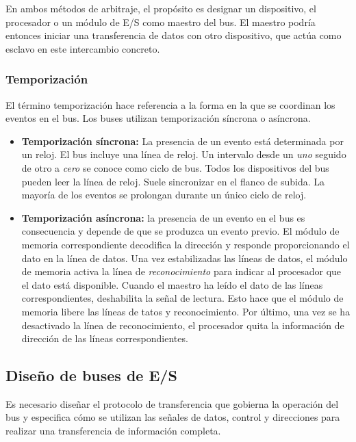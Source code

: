 En ambos métodos de arbitraje, el propósito es designar un dispositivo, el procesador o un módulo de E/S como maestro del bus. El maestro podría entonces iniciar una transferencia de datos con otro dispositivo, que actúa como esclavo en este intercambio concreto.

\subsubsection*{Temporización}

El término temporización hace referencia a la forma en la que se coordinan los eventos en el bus. Los buses utilizan temporización síncrona o asíncrona.

\begin{itemize}
  \item \textbf{Temporización síncrona:} La presencia de un evento está determinada por un reloj. El bus incluye una línea de reloj. Un intervalo desde un \textit{uno} seguido de otro a \textit{cero} se conoce como ciclo de bus. Todos los dispositivos del bus pueden leer la línea de reloj. Suele sincronizar en el flanco de subida. La mayoría de los eventos se prolongan durante un único ciclo de reloj.
  \item \textbf{Temporización asíncrona:} la presencia de un evento en el bus es consecuencia y depende de que se produzca un evento previo. El módulo de memoria correspondiente decodifica la dirección y responde proporcionando el dato en la línea de datos. Una vez estabilizadas las líneas de datos, el módulo de memoria activa la línea de \textit{reconocimiento} para indicar al procesador que el dato está disponible. Cuando el maestro ha leído el dato de las líneas correspondientes, deshabilita la señal de lectura. Esto hace que el módulo de memoria libere las líneas de tatos y reconocimiento. Por último, una vez se ha desactivado la línea de reconocimiento, el procesador quita la información de dirección de las líneas correspondientes.
\end{itemize}

\subsection{Diseño de buses de E/S}

Es necesario diseñar el protocolo de transferencia que gobierna la operación del bus y especifica cómo se utilizan las señales de datos, control y direcciones para realizar una transferencia de información completa.

